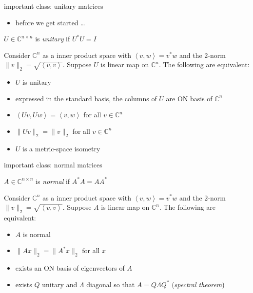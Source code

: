 \documentclass[10pt,hyperref]{beamer}
\newcommand{\CC}{\mathbb{C}}
\newcommand{\ip}[2]{\left<#1,#2\right>}
\begin{document}
\begin{frame}{important class: unitary matrices}

\begin{itemize}
\item before we get started \dots
\end{itemize}

\begin{definition}
$U \in \CC^{n\times n}$ is \emph{unitary} if $U^*U=I$
\end{definition}

\begin{lemma}
Consider $\CC^n$ as a inner product space with $\ip{v}{w}=v^*w$ and the $2$-norm $\|v\|_2 = \sqrt{\ip v v}$.  Suppose $U$ is linear map on $\CC^n$.  The following are equivalent:

\begin{itemize}
\item $U$ is unitary
\item expressed in the standard basis, the columns of $U$ are ON basis of $\CC^n$
\item $\ip{Uv}{Uw}=\ip{v}{w}$ for all $v\in\CC^n$
\item $\|Uv\|_2=\|v\|_2$ for all $v\in\CC^n$
\item $U$ is a metric-space isometry
\end{itemize}
\end{lemma}
\end{frame}


\begin{frame}{important class: normal matrices}

\begin{definition}
$A \in \CC^{n\times n}$ is \emph{normal} if $A^*A=AA^*$
\end{definition}

\begin{lemma}
Consider $\CC^n$ as a inner product space with $\ip{v}{w}=v^*w$ and the $2$-norm $\|v\|_2 = \sqrt{\ip v v}$.  Suppose $A$ is linear map on $\CC^n$.  The following are equivalent:

\begin{itemize}
\item $A$ is normal
\item $\|Ax\|_2 = \|A^*x\|_2$ for all $x$
\item exists an ON basis of eigenvectors of $A$
\item exists $Q$ unitary and $\Lambda$ diagonal so that $A=Q\Lambda Q^*$ (\emph{spectral theorem})
\end{itemize}
\end{lemma}
\end{frame}
\end{document}
